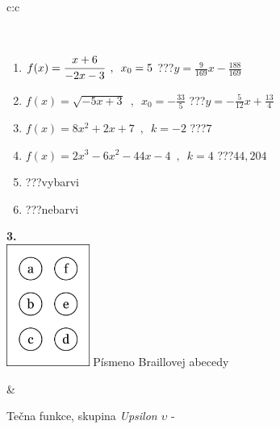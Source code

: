 \documentclass[10pt]{report}
\begin{document}
\begin{tabular}{c:c}
\begin{minipage}[c][104.5mm][t]{0.5\linewidth}
\begin{center}
\begin{minipage}{0.95\linewidth}
\begin{center}
\end{center}
\end{minipage}
\\[1mm]
\begin{minipage}{0.79\linewidth}
\begin{center}
\begin{varwidth}{\linewidth}
\begin{enumerate}
\small
\item $f(x)=\cfrac{x+6}{-2x-3}\enspace , \enspace x_0=5$\quad \dotfill\; ???\;\dotfill \quad $y = \frac{9}{169}x-\frac{188}{169}$
\item $f(x)=\sqrt{-5x+3}\enspace , \enspace x_0=-\frac{33}{5}$\quad \dotfill\; ???\;\dotfill \quad $y = -\frac{5}{12}x+\frac{13}{4}$
\item $f(x)=8x^2+2x+7\enspace , \enspace k=-2$\quad \dotfill\; ???\;\dotfill \quad $7$
\item $f(x)=2x^3-6x^2-44x-4\enspace , \enspace k=4$\quad \dotfill\; ???\;\dotfill \quad $44 , 204$
\item \quad \dotfill\; ???\;\dotfill \quad vybarvi
\item \quad \dotfill\; ???\;\dotfill \quad nebarvi
\end{enumerate}
\end{varwidth}
\end{center}
\end{minipage}
\begin{minipage}{0.20\linewidth}
\begin{center}
{\Huge\bfseries 3.} \\[2mm]
\includegraphics[height=40mm]{../images/braille.png}
{\small Písmeno Braillovej abecedy}
\end{center}
\end{minipage}
\end{center}
\end{minipage}
&
\begin{minipage}[c][104.5mm][t]{0.5\linewidth}
\begin{center}
\vspace{7mm}
{\huge Tečna funkce, skupina \textit{Upsilon $\upsilon$} -}\\[5mm]

\end{center}
\end{minipage}
\end{tabular}
\end{document}
